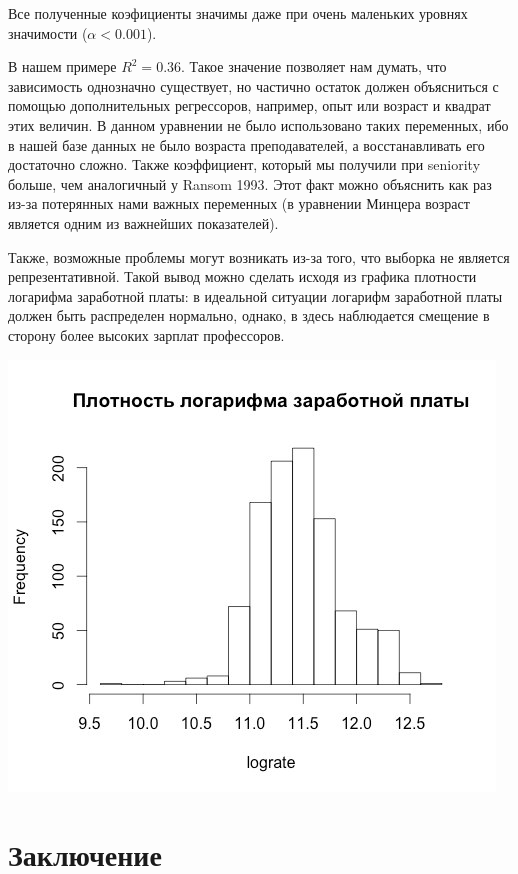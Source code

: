 \documentclass[a4paper, 12pt]{article}
\theoremstyle{definition}
\theoremstyle{plain}
\begin{document}
Все полученные коэфициенты значимы даже при очень маленьких уровнях значимости ($\alpha<0.001$).

В нашем примере $R^2=0.36$. Такое значение позволяет нам думать, что зависимость однозначно существует, но частично остаток должен объясниться с помощью дополнительных регрессоров, например, опыт или возраст и квадрат этих величин. В данном уравнении не было использовано таких переменных, ибо в нашей базе данных не было возраста преподавателей, а восстанавливать его достаточно сложно.
Также коэффициент, который мы получили при seniority больше, чем аналогичный у Ransom 1993. Этот факт можно объяснить как раз из-за потерянных нами важных переменных (в уравнении Минцера возраст является одним из важнейших показателей).

Также, возможные проблемы могут возникать из-за того, что выборка не является репрезентативной. Такой вывод можно сделать исходя из графика плотности логарифма заработной платы: в идеальной ситуации логарифм заработной платы должен быть распределен нормально, однако, в здесь наблюдается смещение в сторону более высоких зарплат профессоров.


\begin{center}
\includegraphics[scale=0.5]{image1}
\end{center}

\section{Заключение}
\end{document}
